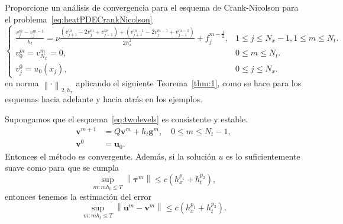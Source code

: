 \begin{questions}
	\question

	Proporcione un análisis de convergencia para el esquema de
	Crank-Nicolson para el problema~\eqref{eq:heatPDECrankNicolson}
	\begin{equation}\label{eq:heatPDECrankNicolson}
		\begin{cases}\displaystyle
			\frac{v^{m}_{j}-v^{m-1}_{j}}{h_{t}}=
			\nu
			\frac{
				\left(v^{m}_{j+1}-2v^{m}_{j}+v^{m}_{j-1}\right)+
				\left(v^{m-1}_{j+1}-2v^{m-1}_{j}+v^{m-1}_{j-1}\right)
			}{2h^{2}_{x}}+
			f^{m-\frac{1}{2}}_{j},             &
			1\leq j\leq N_{x}-1, 1\leq m\leq N_{t}. \\
			v^{m}_{0}=v^{m}_{N_{x}}=0,         &
			0\leq m\leq N_{t}.                      \\
			v^{0}_{j}=u_{0}\left(x_{j}\right), &
			0\leq j\leq N_{x}.
		\end{cases}
	\end{equation}
	en norma ${\left\|\cdot\right\|}_{2,h_{x}}$ aplicando el siguiente
	Teorema~\ref{thm:1},
	como se hace para los esquemas hacia adelante y hacia atrás en los ejemplos.
	\begin{theorem}\label{thm:1}
		Supongamos que el esquema~\eqref{eq:twolevels} es consistente y estable.
		\begin{equation}\label{eq:twolevels}
			\begin{aligned}
				\symbf{v}^{m+1} & =
				Q\symbf{v}^{m}+
				h_{t}\symbf{g}^{m},\quad 0\leq m\leq N_{t}-1, \\
				\symbf{v}^{0}   & =
				\symbf{u}_{0}.
			\end{aligned}
		\end{equation}
		Entonces el método es convergente.
		Además, si la solución $u$ es lo suficientemente suave como para que se cumpla
		\begin{equation}
			\sup_{m:mh_{t}\leq T}
			\left\|\symbf{\tau}^{m}\right\|\leq
			c\left(h^{p_{1}}_{x}+h^{p_{2}}_{t}\right),
		\end{equation}
		entonces tenemos la estimación del error
		\begin{equation*}
			\sup_{m:mh_{t}\leq T}
			\left\|\symbf{u}^{m}-\symbf{v}^{m}\right\|\leq
			c\left(h^{p_{1}}_{x}+h^{p_{2}}_{t}\right).
		\end{equation*}
	\end{theorem}

	\question


\end{questions}
